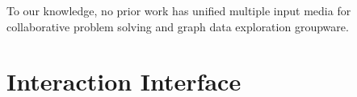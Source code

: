 \documentclass[runningheads,a4paper]{llncs}
\begin{document}
To our knowledge, no prior work has 
unified
multiple input media for collaborative problem solving and 
graph data exploration groupware. 

\vspace{-0.1in}
\section{Interaction Interface}
\vspace{-0.1in}
\end{document}
